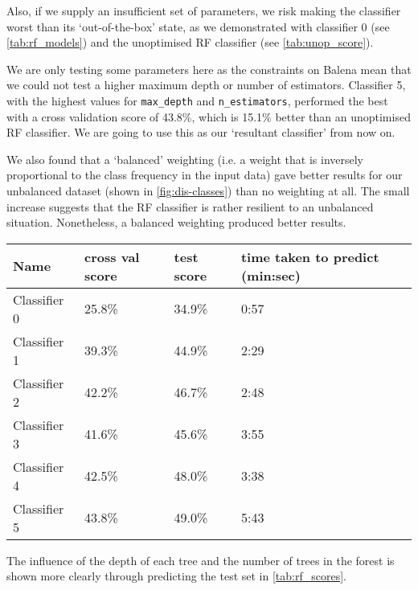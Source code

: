 Also, if we supply an insufficient set of parameters, we risk making the classifier worst than its `out-of-the-box' state, as we demonstrated with classifier 0 (see \autoref{tab:rf_models}) and the unoptimised RF classifier (see \autoref{tab:unop_score}).

We are only testing some parameters here as the constraints on Balena mean that we could not test a higher maximum depth or number of estimators. Classifier 5, with the highest values for \texttt{max{\_}depth} and \texttt{n{\_}estimators}, performed the best with a cross validation score of 43.8\%, which is 15.1\% better than an unoptimised RF classifier. We are going to use this as our `resultant classifier' from now on.

We also found that a `balanced' weighting (i.e. a weight that is inversely proportional to the class frequency in the input data) gave better results for our unbalanced dataset (shown in \autoref{fig:dis-classes}) than no weighting at all. The small increase suggests that the RF classifier is rather resilient to an unbalanced situation. Nonetheless, a balanced weighting produced better results.

\vspace{15pt}
\parbox{\linewidth} {
	\centering
  \begin{tabular}{|M{0.15\textwidth}|M{0.15\textwidth}|M{0.15\textwidth}|M{0.15\textwidth}|}
		\hline 
    \textbf{Name} & 
    \textbf{cross val score} & 
    \textbf{test score} &
    \textbf{time taken to predict (min:sec)} 
		\\ \hline
    Classifier 0 & 25.8\% & 34.9\% & 0:57
		\\ \hline
    Classifier 1 & 39.3\% & 44.9\% & 2:29
		\\ \hline
    Classifier 2 & 42.2\% & 46.7\% & 2:48
		\\ \hline
    Classifier 3 & 41.6\% & 45.6\% & 3:55
		\\ \hline
    Classifier 4 & 42.5\% & 48.0\% & 3:38
		\\ \hline
    Classifier 5 & 43.8\% & 49.0\% & 5:43
		\\ \hline
	\end{tabular}
\label{tab:rf_scores}
}
\vspace{15pt}

The influence of the depth of each tree and the number of trees in the forest is shown more clearly through predicting the test set in \autoref{tab:rf_scores}. 

